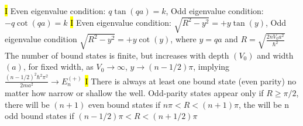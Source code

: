\documentclass[fontsize=4pt]{scrartcl}
\begin{document}
\hl{I}
Even eigenvalue condition: $q\tan(qa) = k$, Odd eigenvalue condition: $-q\cot(qa) = k$
\hl{I}
Even eigenvalue condition: $\sqrt{R^2 - y^2 } = +y\tan(y)$, Odd eigenvalue condition $\sqrt{R^2 - y^2 } = +y\cot(y)$, where $ y = qa$ and $ R = \sqrt{\frac{2nV_0a^2}{\hbar^2}}$
The number of bound states is finite, but increases with depth $(V_0)$ and width $(a)$, for fixed width, as $V_0 \rightarrow \infty$, $y\rightarrow(n-1/2)\pi $, implying $ \frac{(n-1/2)^2 \hbar^2 \pi^2}{2ma^2} \rightarrow E_n^{(+)}$
\hl{I}
There is always at least one bound state (even parity) no matter how narrow or shallow the well. Odd-parity states appear only if $R \geq \pi/2$, there will be $(n+1)$ even bound states if $n\pi < R < (n+1)\pi$, the will be n odd bound states if $(n-1/2)\pi < R <(n+1/2)\pi$
\end{document}
